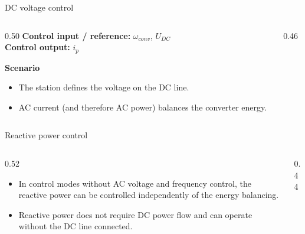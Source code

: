 \begin{frame}{DC voltage control}
  \begin{columns}[c,onlytextwidth]
    \begin{column}{0.50\textwidth}
      \textbf{Control input / reference:} $\omega_{conv}$, $U_{DC}$\\[0.4em]
      \textbf{Control output:} $i_p$
      \vspace{0.6em}

      \textbf{Scenario}
      \begin{itemize}
        \setlength{\itemsep}{0.3em}
        \item The station defines the voltage on the DC line.
        \item AC current (and therefore AC power) balances the converter
              energy.
      \end{itemize}
    \end{column}
    \begin{column}{0.46\textwidth}
      \centering
    \end{column}
  \end{columns}
\end{frame}


\begin{frame}{Reactive power control}
  \begin{columns}[c,onlytextwidth]
    \begin{column}{0.52\textwidth}
      \begin{itemize}
        \setlength{\itemsep}{0.5em}
        \item In control modes without AC voltage and frequency control, the
              reactive power can be controlled independently of the energy
              balancing.
        \item Reactive power does not require DC power flow and can operate
              without the DC line connected.
      \end{itemize}
    \end{column}
    \begin{column}{0.44\textwidth}
      \centering
    \end{column}
  \end{columns}
\end{frame}


